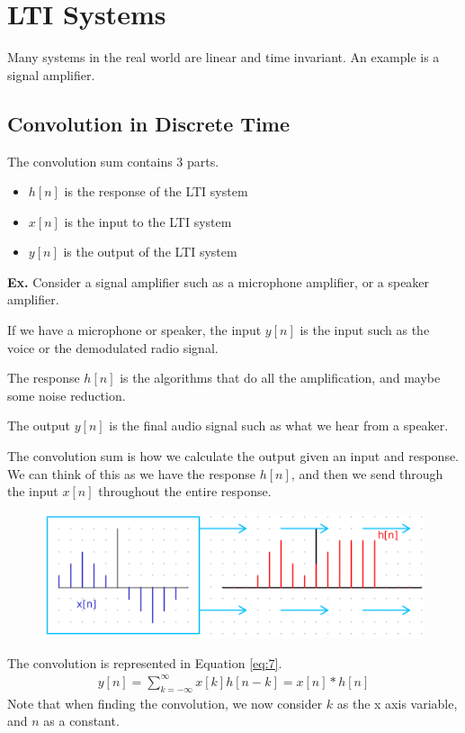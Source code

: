 \documentclass[12pt,letterpaper]{article} \usepackage{amsmath} \usepackage{graphicx} \usepackage[margin=1in]{geometry} \usepackage{longtable}  \usepackage{amssymb}
\begin{document}
	\section{LTI Systems}
	Many systems in the real world are linear and time invariant. An example is a signal amplifier. 
	
	\subsection{Convolution in Discrete Time}
	The convolution sum contains 3 parts. 
	\begin{itemize}
		\item $h[n]$ is the response of the LTI system
		\item $x[n]$ is the input to the LTI system
		\item $y[n]$ is the output of the LTI system
	\end{itemize}
	
	\begin{mdframed}
		\textbf{Ex.} Consider a signal amplifier such as a microphone amplifier, or a speaker amplifier. 
		
		If we have a microphone or speaker, the input $y[n]$ is the input such as the voice or the demodulated radio signal. 
		
		The response $h[n]$ is the algorithms that do all the amplification, and maybe some noise reduction. 
		
		The output $y[n]$ is the final audio signal such as what we hear from a speaker. 
	\end{mdframed}
	
	The convolution sum is how we calculate the output given an input and response. We can think of this as we have the response $h[n]$, and then we send through the input $x[n]$ throughout the entire response. 
	\begin{figure}
		\centering
		\includegraphics[width=0.7\linewidth]{"images/convolution idea"}
		\label{fig:convolution-idea}
	\end{figure}
	
	The convolution is represented in Equation \ref{eq:7}.
	\begin{align}
		y[n] = \sum^{\infty}_{k=-\infty} x[k]h[n-k] = x[n]*h[n] \label{eq:7}
	\end{align}
	Note that when finding the convolution, we now consider $k$ as the x axis variable, and $n$ as a constant. 
	
\end{document}
